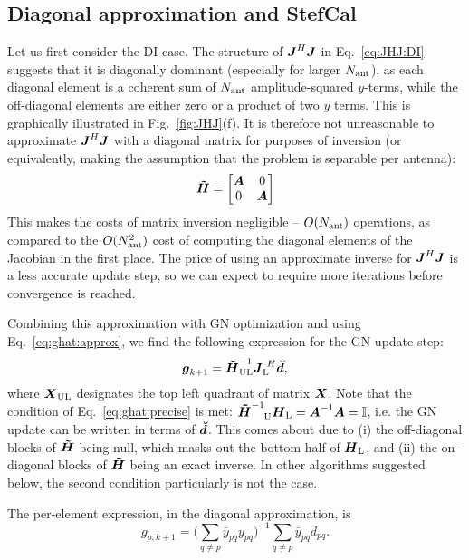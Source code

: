 \documentclass[useAMS,usenatbib]{mn2e}
\makeatletter
\newcommand{\II}{\mathbb{I}}
\newcommand{\vecg}{\bmath{g}}
\newcommand{\mat}[1]{{\bmath{#1}}}
\newcommand{\JJ}{\mat{J}} %
\newcommand{\HH}{\mat{H}} %
\newcommand{\HHa}{\mat{\tilde{H}}} %
\newcommand{\JHJ}{\JJ^H\JJ} %
\newcommand{\Matrix}[2]{\left [ \begin{array}{@{}#1@{}}#2\end{array} \right ]}
\newcommand{\AUG}[1]{\bmath{\breve{#1}}}
\newcommand{\Dd}{\AUG{d}}
\newcommand{\TOP}{\mathrm{U}}%
\newcommand{\LEFT}{\mathrm{L}}
\newcommand{\UL}{\mathrm{UL}}%
\newcommand{\StefCal}{{\sc StefCal}}
\numberwithin{equation}{section}
\makeatother
\begin{document}
\subsection{Diagonal approximation and \StefCal}
\label{sec:DI:stefcal}

Let us first consider the DI case. The structure of $\JJ^H\JJ$ in Eq.~\ref{eq:JHJ:DI} suggests that it is diagonally 
dominant (especially for larger $N_\mathrm{ant}$), as each diagonal element is a coherent sum of $N_\mathrm{ant}$ amplitude-squared $y$-terms, 
while the off-diagonal elements are either zero or a product of two $y$ terms. This is graphically illustrated in 
Fig.~\ref{fig:JHJ}(f). It is therefore not unreasonable 
to approximate $\JHJ$ with a diagonal matrix for purposes of inversion (or equivalently, making the assumption that 
the problem is separable per antenna):
\begin{equation}
\HHa = \Matrix{cc}{\bmath{A}&0\\0&\bmath{A}}
\end{equation}
This makes the costs of matrix inversion negligible -- $O(N_\mathrm{ant})$ operations, as compared to the $O(N_\mathrm{ant}^2)$ cost 
of computing the diagonal elements of the Jacobian in the first place. The price of using an approximate inverse for 
$\JHJ$ is a less accurate update step, so we can expect to require more iterations before convergence is reached.

Combining this approximation with GN optimization and using Eq.~\ref{eq:ghat:approx}, we find the following expression
for the GN update step:
\begin{equation}
\label{eq:stefcal-matrix}
\vecg_{k+1} = \HHa^{-1}_{\UL} \JJ_\LEFT^{~H} \Dd,
\end{equation}
where $\bmath{X}_\UL$ designates the top left quadrant of matrix $\bmath{X}$. Note that the condition of 
Eq.~\ref{eq:ghat:precise} is met: $\HHa^{-1}_{~~~\TOP} \HH_\LEFT=\bmath{A}^{-1}\bmath{A}=\II$, i.e. the
GN update can be written in terms of $\Dd$. This comes about due to
(i) the off-diagonal blocks of $\HHa$ being null, which masks out the bottom half of $\HH_\LEFT$, and 
(ii) the on-diagonal blocks of $\HHa$ being an exact inverse. In other algorithms suggested below, the second
condition particularly is not the case.

The per-element expression, in the diagonal approximation, is
\begin{equation}
\label{eq:stefcal}
g_{p,k+1} = \big( \sum\limits_{q\ne p} \bar{y}_{pq} y_{pq} \big)^{-1} \sum\limits_{q\ne p} \bar{y}_{pq} d_{pq}.
\end{equation}
\end{document}
